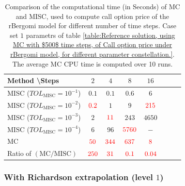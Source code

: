\begin{table}[h!]
	\centering
	\begin{tabular}{l*{6}{c}r}
		Method \textbackslash  Steps            & $2$ & $4$ & $8$ & $16$ &   \\
		\hline
		MISC ($TOL_{\text{MISC}}=10^{-1}$)  & $0.1$ & $0.1$ & $0.6$ & $6$  \\
		MISC ($TOL_{\text{MISC}}=10^{-2}$)  & ${\color{red}0.2}$ & $1$ & $9$ & ${\color{red}215}$  \\
		MISC ($TOL_{\text{MISC}}=10^{-3}$)  & $2$ & ${\color{red}11}$ & $243$ & $4650$  \\
		MISC ($TOL_{\text{MISC}}=10^{-4}$)  & $6$ & $96$ & ${\color{red}5760}$ & $-$  \\
		\hline
		MC     & ${\color{red} 50}$  & ${\color{red}344}$  & ${\color{red}637}$ & ${\color{red}8}$  \\
		
		\hline
		Ratio of $\left(\text{MC}/ \text{MISC} \right)$  &${\color{red}  250}$ & ${\color{red}    31
		}$  & ${\color{red} 0.1
		}$  & ${\color{red}  0.04}$ \\
		\hline
	\end{tabular}
	\caption{Comparison of the computational time (in Seconds) of  MC and MISC, used to compute call option price of the rBergomi model for different number of time steps. Case set $1$ parametrs of table \ref{table:Reference solution, using MC with $500$ time steps, of Call option price under rBergomi model, for different parameter constellation.}. The
		average MC CPU time is computed over 10 runs. }
	\label{Comparison of the computational time of  MC and MISC, used to compute Call option price of rBergomi model for different number of time steps. Case set1}
\end{table}

\FloatBarrier
\subsubsection*{With Richardson extrapolation (level $1$)}







